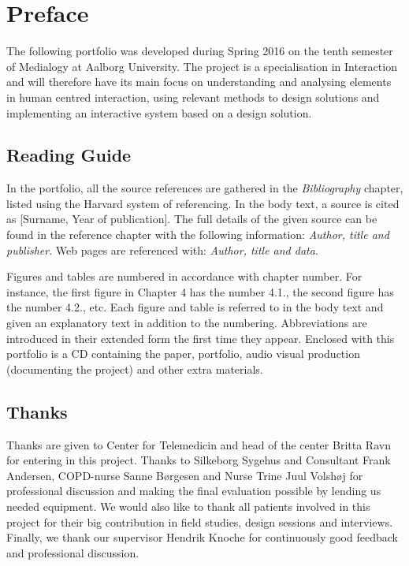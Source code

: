 \chapter{Preface}

The following portfolio was developed during Spring 2016 on the tenth semester of Medialogy at Aalborg University. The project is a specialisation in Interaction and will therefore have its main focus on understanding and analysing elements in human centred interaction, using relevant methods to design solutions and implementing an interactive system based on a design solution.

\section*{Reading Guide}
In the portfolio, all the source references are gathered in the \textit{Bibliography} chapter, listed using the Harvard system of referencing. In the body text, a source is cited as [Surname, Year of publication]. The full details of the given source can be found in the reference chapter with the following information: \textit{Author, title and publisher}. Web pages are referenced with: \textit{Author, title and data}.

Figures and tables are numbered in accordance with chapter number. For instance, the first figure in Chapter 4 has the number 4.1., the second figure has the number 4.2., etc. Each figure and table is referred to in the body text and given an explanatory text in addition to the numbering. Abbreviations are introduced in their extended form the first time they appear. Enclosed with this portfolio is a CD containing the paper, portfolio, audio visual production (documenting the project) and other extra materials. 

\section*{Thanks}
Thanks are given to Center for Telemedicin and head of the center Britta Ravn for entering in this project. Thanks to Silkeborg Sygehus and Consultant Frank Andersen, COPD-nurse Sanne B{\o}rgesen and Nurse Trine Juul Volsh{\o}j for professional discussion and making the final evaluation possible by lending us needed equipment. We would also like to thank all patients involved in this project for their big contribution in field studies, design sessions and interviews. 
Finally, we thank our supervisor Hendrik Knoche for continuously good feedback and professional discussion.


